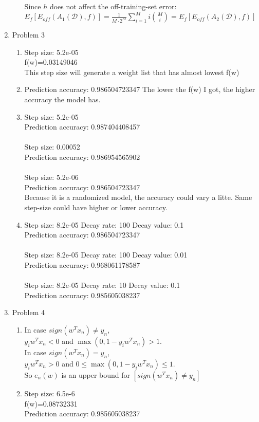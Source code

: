 \documentclass{amsart}
\begin{document}
\begin{enumerate}
\begin{enumerate}
Since $h$ does not affect the off-training-set error:\\
$E_f[E_{off}(A_1(\mathcal{D}),f)]=\displaystyle\frac{1}{M\cdot 2^M}\sum^M_{i=1}i\binom Mi=E_f[E_{off}(A_2(\mathcal{D}),f)]$\\
\end{enumerate}
\item Problem 3
\begin{enumerate}
\item Step size: 5.2e-05\\
f(w)=0.03149046\\
This step size will generate a weight list that has almost lowest f(w)
\item Prediction accuracy: 0.986504723347
The lower the f(w) I got, the higher accuracy the model has.
\item Step size: 5.2e-05\\
Prediction accuracy: 0.987404408457\\\\
Step size: 0.00052\\
Prediction accuracy: 0.986954565902\\\\
Step size: 5.2e-06\\
Prediction accuracy: 0.986504723347\\
Because it is a randomized model, the accuracy could vary a litte. Same step-size could have higher or lower accuracy.
\item Step size: 8.2e-05 Decay rate: 100 Decay value: 0.1\\
Prediction accuracy: 0.986504723347\\\\
Step size: 8.2e-05 Decay rate: 100 Decay value: 0.01\\
Prediction accuracy: 0.968061178587\\\\
Step size: 8.2e-05 Decay rate: 10 Decay value: 0.1\\
Prediction accuracy: 0.985605038237
\end{enumerate}
\item Problem 4
\begin{enumerate}
\item In case $sign(w^Tx_n)\neq y_n$,\\ $y_iw^Tx_n < 0$ and $\max(0,1-y_iw^Tx_n)>1$.\\
In case $sign(w^Tx_n)=y_n$,\\ $y_iw^Tx_n > 0$ and $0\leq \max(0,1-y_iw^Tx_n)\leq1$.\\
So $e_n(w)$ is an upper bound for $[sign(w^Tx_n)\neq y_n]$
\item Step size: 6.5e-6\\
f(w)=0.08732331\\
Prediction accuracy: 0.985605038237

\end{enumerate}
\end{enumerate}
\end{document}
